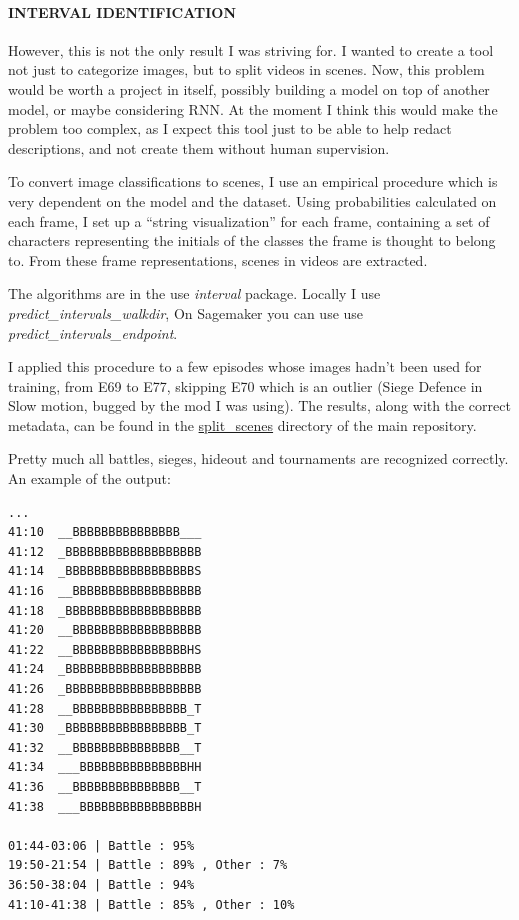 \documentclass[
]{article}
\begin{document}
\hypertarget{interval-identification}{%
\paragraph{INTERVAL IDENTIFICATION}\label{interval-identification}}

However, this is not the only result I was striving for. I wanted to
create a tool not just to categorize images, but to split videos in
scenes. Now, this problem would be worth a project in itself, possibly
building a model on top of another model, or maybe considering RNN. At
the moment I think this would make the problem too complex, as I expect
this tool just to be able to help redact descriptions, and not create
them without human supervision.

To convert image classifications to scenes, I use an empirical
procedure which is very dependent on the model and the dataset. Using
probabilities calculated on each frame, I set up a ``string
visualization'' for each frame, containing a set of characters 
representing the initials of the classes the frame is thought to 
belong to. From these frame representations, scenes in videos are
 extracted.
 

The algorithms are in the use \emph{interval} package.
Locally I use \emph{predict\_intervals\_walkdir},
On Sagemaker you can use use \emph{predict\_intervals\_endpoint}.

I applied this procedure to a few episodes whose images hadn't been used
for training, from E69 to E77, skipping E70 which is an outlier (Siege
Defence in Slow motion, bugged by the mod I was using). The
results, along with the correct metadata, can be found in the
\url{split_scenes} directory of the main repository.

Pretty much all battles, sieges, hideout and tournaments are recognized
correctly. An example of the output:

\begin{verbatim}
...
41:10  __BBBBBBBBBBBBBBB___
41:12  _BBBBBBBBBBBBBBBBBBB
41:14  _BBBBBBBBBBBBBBBBBBS
41:16  __BBBBBBBBBBBBBBBBBB
41:18  _BBBBBBBBBBBBBBBBBBB
41:20  __BBBBBBBBBBBBBBBBBB
41:22  __BBBBBBBBBBBBBBBBHS
41:24  _BBBBBBBBBBBBBBBBBBB
41:26  _BBBBBBBBBBBBBBBBBBB
41:28  __BBBBBBBBBBBBBBBB_T
41:30  _BBBBBBBBBBBBBBBBB_T
41:32  __BBBBBBBBBBBBBBB__T
41:34  ___BBBBBBBBBBBBBBBHH
41:36  __BBBBBBBBBBBBBBB__T
41:38  ___BBBBBBBBBBBBBBBBH

01:44-03:06 | Battle : 95%
19:50-21:54 | Battle : 89% , Other : 7%
36:50-38:04 | Battle : 94%
41:10-41:38 | Battle : 85% , Other : 10% 
\end{verbatim}
\end{document}
